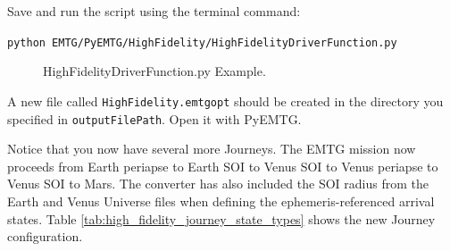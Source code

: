 \documentclass[11pt]{article}
\begin{document}
\noindent Save and run the script using the terminal command:

\noindent \texttt{python EMTG/PyEMTG/HighFidelity/HighFidelityDriverFunction.py} 

\begin{figure}[H]
	\centering
	\caption{\label{fig:highfidelitydriverfunction_example}HighFidelityDriverFunction.py Example.}
\end{figure}

\noindent A new file called \texttt{HighFidelity.emtgopt} should be created in the directory you specified in \texttt{outputFilePath}. Open it with PyEMTG.

\noindent Notice that you now have several more Journeys. The \ac{EMTG} mission now proceeds from Earth periapse to Earth \acs{SOI} to Venus \acs{SOI} to Venus periapse to Venus \acs{SOI} to Mars. The converter has also included the \acs{SOI} radius from the Earth and Venus Universe files when defining the ephemeris-referenced arrival states. Table \ref{tab:high_fidelity_journey_state_types} shows the new Journey configuration.
\end{document}
